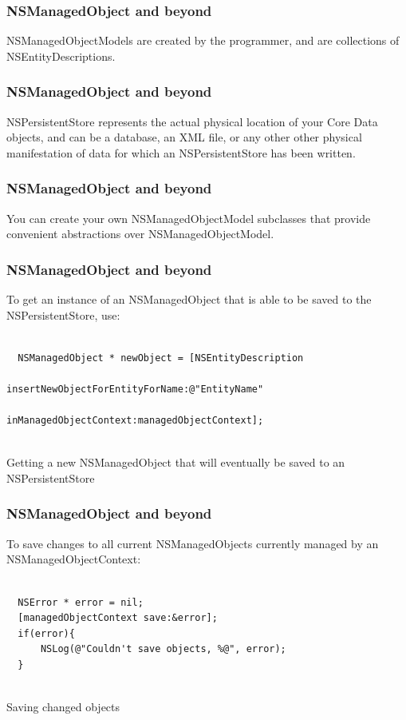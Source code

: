 \documentclass[10pt]{beamer}
\begin{document}
\begin{frame}[fragile]
  \frametitle{NSManagedObject and beyond}
  NSManagedObjectModels are created by the programmer, and are collections of NSEntityDescriptions.

\end{frame}

\begin{frame}[fragile]
  \frametitle{NSManagedObject and beyond}
  NSPersistentStore represents the actual physical location of your Core Data objects, and can be a database, an XML file, or any other other physical manifestation of data for which an NSPersistentStore has been written.

\end{frame}

\begin{frame}[fragile]
  \frametitle{NSManagedObject and beyond}
  You can create your own NSManagedObjectModel subclasses that provide convenient abstractions over NSManagedObjectModel.

\end{frame}

\begin{frame}[fragile]
  \frametitle{NSManagedObject and beyond}
  To get an instance of an NSManagedObject that is able to be saved to the NSPersistentStore, use:
\begin{listing}[H]
    \begin{verbatim}
  
  NSManagedObject * newObject = [NSEntityDescription
                                 insertNewObjectForEntityForName:@"EntityName"
                                 inManagedObjectContext:managedObjectContext];
                
  \end{verbatim}
    \caption{Getting a new NSManagedObject that will eventually be saved to an NSPersistentStore}
    \label{listing:39}
  \end{listing}

\end{frame}

\begin{frame}[fragile]
  \frametitle{NSManagedObject and beyond}
  To save changes to all current NSManagedObjects currently managed by an NSManagedObjectContext:
\begin{listing}[H]
    \begin{verbatim}
  
  NSError * error = nil;
  [managedObjectContext save:&error];
  if(error){
      NSLog(@"Couldn't save objects, %@", error);
  }
                
  \end{verbatim}
    \caption{Saving changed objects}
    \label{listing:40}
  \end{listing}

\end{frame}
\end{document}
